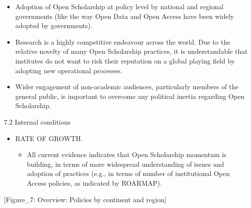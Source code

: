 \documentclass[]{article}
\providecommand{\tightlist}{%
  \setlength{\itemsep}{0pt}\setlength{\parskip}{0pt}}
\begin{document}
\begin{itemize}
  \begin{itemize}
  \item
    Adoption of Open Scholarship at policy level by national and
    regional governments (like the way Open Data and Open Access have
    been widely adopted by governments).
  \item
    Research is a highly competitive endeavour across the world. Due to
    the relative novelty of many Open Scholarship practices, it is
    understandable that institutes do not want to risk their reputation
    on a global playing field by adopting new operational processes.
  \item
    Wider engagement of non-academic audiences, particularly members of
    the general public, is important to overcome any political inertia
    regarding Open Scholarship.
  \end{itemize}
\end{itemize}

7.2 Internal conditions

\begin{itemize}
\item
  RATE OF GROWTH.

  \begin{itemize}
  \tightlist
  \item
    All current evidence indicates that Open Scholarship momentum is
    building, in terms of more widespread understanding of issues and
    adoption of practices (e.g., in terms of number of institutional
    Open Access policies, as indicated by ROARMAP).
  \end{itemize}
\end{itemize}

{[}Figure\_7: Overview: Policies by continent and region{]}
\end{document}

